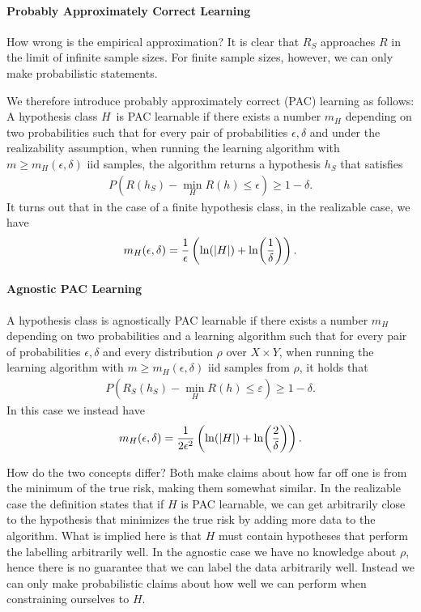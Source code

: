 \paragraph{Probably Approximately Correct Learning}
How wrong is the empirical approximation? It is clear that $R_{S}$ approaches $R$ in the limit of infinite sample sizes. For finite sample sizes, however, we can only make probabilistic statements.

We therefore introduce probably approximately correct (PAC) learning as follows: A hypothesis class $H$ is PAC learnable if there exists a number $m_{H}$ depending on two probabilities such that for every pair of probabilities $\epsilon, \delta$ and under the realizability assumption, when running the learning algorithm with $m\geq m_{H}(\epsilon, \delta)$ iid samples, the algorithm returns a hypothesis $h_{S}$ that satisfies
\begin{align*}
	P(R(h_{S}) - \min\limits_{H}R(h)\leq \epsilon) \geq 1 - \delta.
\end{align*}
It turns out that in the case of a finite hypothesis class, in the realizable case, we have
\begin{align*}
	m_{H}(\epsilon, \delta) = \frac{1}{\epsilon}\left(\ln(\abs{H}) + \ln(\frac{1}{\delta})\right).
\end{align*}

\paragraph{Agnostic PAC Learning}
A hypothesis class is agnostically PAC learnable if there exists a number $m_{H}$ depending on two probabilities and a learning algorithm such that for every pair of probabilities $\epsilon, \delta$ and every distribution $\rho$ over $X\times Y$, when running the learning algorithm with $m\geq m_{H}(\epsilon, \delta)$ iid samples from $\rho$, it holds that
\begin{align*}
	P(R_{S}(h_{S}) - \min\limits_{H}R(h) \leq \varepsilon) \geq 1 - \delta.
\end{align*}
In this case we instead have
\begin{align*}
	m_{H}(\epsilon, \delta) = \frac{1}{2\epsilon^{2}}\left(\ln(\abs{H}) + \ln(\frac{2}{\delta})\right).
\end{align*}

How do the two concepts differ? Both make claims about how far off one is from the minimum of the true risk, making them somewhat similar. In the realizable case the definition states that if $H$ is PAC learnable, we can get arbitrarily close to the hypothesis that minimizes the true risk by adding more data to the algorithm. What is implied here is that $H$ must contain hypotheses that perform the labelling arbitrarily well. In the agnostic case we have no knowledge about $\rho$, hence there is no guarantee that we can label the data arbitrarily well. Instead we can only make probabilistic claims about how well we can perform when constraining ourselves to $H$.

